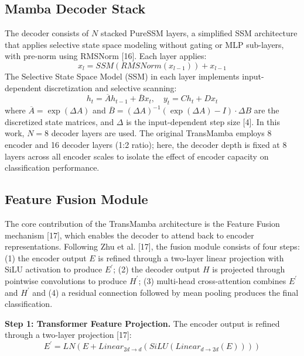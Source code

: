 \documentclass[10pt, conference]{IEEEtran}
\begin{document}
\subsection{Mamba Decoder Stack} %
The decoder consists of $N$ stacked PureSSM layers, a simplified SSM architecture that applies selective state space modeling without gating or MLP sub-layers, with pre-norm using RMSNorm [16]. %
Each layer applies: %
\begin{equation}
x_l = SSM(RMSNorm(x_{l-1})) + x_{l-1} %
\end{equation}
The Selective State Space Model (SSM) in each layer implements input-dependent discretization and selective scanning: %
\begin{equation}
h_{t}=\overline{A}h_{t-1}+\overline{B}x_{t}, \quad y_{t}=Ch_{t}+Dx_{t} %
\end{equation}
where $\overline{A}=\exp(\Delta A)$ and $\overline{B}=(\Delta A)^{-1}(\exp(\Delta A)-I)\cdot \Delta B$ are the discretized state matrices, and $\Delta$ is the input-dependent step size [4]. %
In this work, $N=8$ decoder layers are used. The original TransMamba employs 8 encoder and 16 decoder layers (1:2 ratio); here, the decoder depth is fixed at 8 layers across all encoder scales to isolate the effect of encoder capacity on classification performance. %

\subsection{Feature Fusion Module} %
The core contribution of the TransMamba architecture is the Feature Fusion mechanism [17], which enables the decoder to attend back to encoder representations. %
Following Zhu et al. [17], the fusion module consists of four steps: (1) the encoder output $E$ is refined through a two-layer linear projection with SiLU activation to produce $E^{\prime}$; (2) the decoder output $H$ is projected through pointwise convolutions to produce $H^{\prime}$; (3) multi-head cross-attention combines $E^{\prime}$ and $H^{\prime}$ and (4) a residual connection followed by mean pooling produces the final classification. %

\textbf{Step 1: Transformer Feature Projection.} The encoder output is refined through a two-layer projection [17]: %
\begin{equation}
E^{\prime}=LN(E+Linear_{2d\rightarrow d}(SiLU(Linear_{d\rightarrow 2d}(E)))) %
\end{equation}
\end{document}
